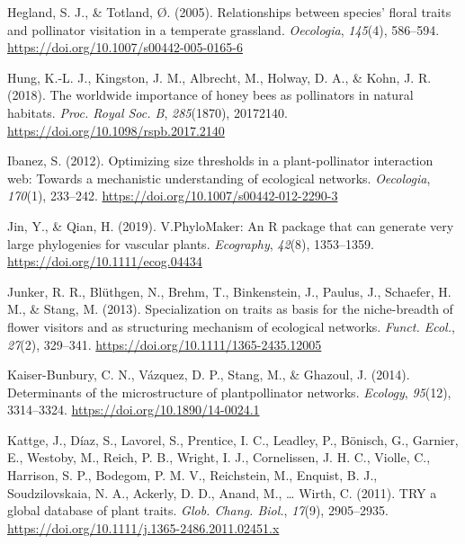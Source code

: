 \documentclass[
  12pt,
  a4paper,
]{article}
\newlength{\cslhangindent}
\newlength{\cslentryspacingunit} %
\newenvironment{CSLReferences}[2] %
 {%
  \setlength{\parindent}{0pt}
  \ifodd #1
  \let\oldpar\par
  \def\par{\hangindent=\cslhangindent\oldpar}
  \fi
  \setlength{\parskip}{#2\cslentryspacingunit}
 }%
 {}
\begin{document}
\begin{CSLReferences}{1}{0}
\leavevmode{}%
Hegland, S. J., \& Totland, Ø. (2005). Relationships between species' floral traits and pollinator visitation in a temperate grassland. \emph{Oecologia}, \emph{145}(4), 586--594. \url{https://doi.org/10.1007/s00442-005-0165-6}

\leavevmode{}%
Hung, K.-L. J., Kingston, J. M., Albrecht, M., Holway, D. A., \& Kohn, J. R. (2018). The worldwide importance of honey bees as pollinators in natural habitats. \emph{Proc. Royal Soc. B}, \emph{285}(1870), 20172140. \url{https://doi.org/10.1098/rspb.2017.2140}

\leavevmode{}%
Ibanez, S. (2012). Optimizing size thresholds in a plant-pollinator interaction web: Towards a mechanistic understanding of ecological networks. \emph{Oecologia}, \emph{170}(1), 233--242. \url{https://doi.org/10.1007/s00442-012-2290-3}

\leavevmode{}%
Jin, Y., \& Qian, H. (2019). V.{PhyloMaker}: An {R} package that can generate very large phylogenies for vascular plants. \emph{Ecography}, \emph{42}(8), 1353--1359. \url{https://doi.org/10.1111/ecog.04434}

\leavevmode{}%
Junker, R. R., Blüthgen, N., Brehm, T., Binkenstein, J., Paulus, J., Schaefer, H. M., \& Stang, M. (2013). Specialization on traits as basis for the niche-breadth of flower visitors and as structuring mechanism of ecological networks. \emph{Funct. Ecol.}, \emph{27}(2), 329--341. \url{https://doi.org/10.1111/1365-2435.12005}

\leavevmode{}%
Kaiser-Bunbury, C. N., Vázquez, D. P., Stang, M., \& Ghazoul, J. (2014). Determinants of the microstructure of plant\textendash pollinator networks. \emph{Ecology}, \emph{95}(12), 3314--3324. \url{https://doi.org/10.1890/14-0024.1}

\leavevmode{}%
Kattge, J., Díaz, S., Lavorel, S., Prentice, I. C., Leadley, P., Bönisch, G., Garnier, E., Westoby, M., Reich, P. B., Wright, I. J., Cornelissen, J. H. C., Violle, C., Harrison, S. P., Bodegom, P. M. V., Reichstein, M., Enquist, B. J., Soudzilovskaia, N. A., Ackerly, D. D., Anand, M., \ldots{} Wirth, C. (2011). {TRY} \textendash{} a global database of plant traits. \emph{Glob. Chang. Biol.}, \emph{17}(9), 2905--2935. \url{https://doi.org/10.1111/j.1365-2486.2011.02451.x}


\end{CSLReferences}
\end{document}
